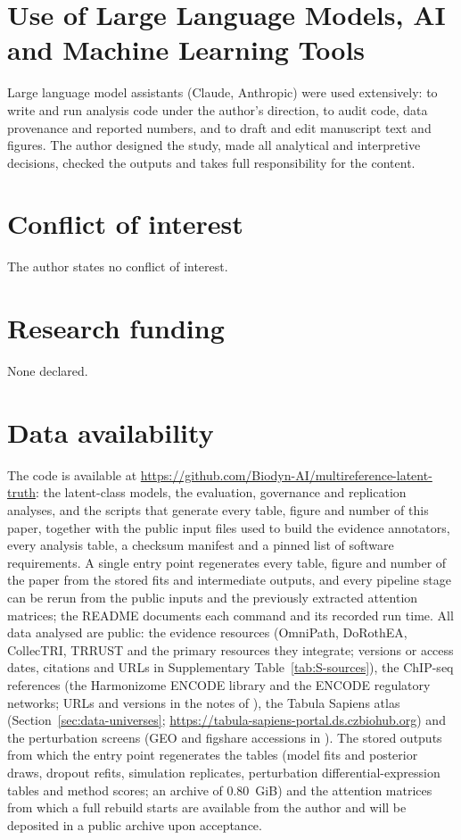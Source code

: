 \documentclass[11pt,a4paper]{article}
\begin{document}
\section*{Use of Large Language Models, AI and Machine Learning Tools}
Large language model assistants (Claude, Anthropic) were used extensively: to write and run analysis code under the author's direction, to audit code, data provenance and reported numbers, and to draft and edit manuscript text and figures. The author designed the study, made all analytical and interpretive decisions, checked the outputs and takes full responsibility for the content.

\section*{Conflict of interest}
The author states no conflict of interest.

\section*{Research funding}
None declared.

\section*{Data availability}
The code is available at \url{https://github.com/Biodyn-AI/multireference-latent-truth}: the latent-class models, the evaluation, governance and replication analyses, and the scripts that generate every table, figure and number of this paper, together with the public input files used to build the evidence annotators, every analysis table, a checksum manifest and a pinned list of software requirements.
A single entry point regenerates every table, figure and number of the paper from the stored fits and intermediate outputs, and every pipeline stage can be rerun from the public inputs and the previously extracted attention matrices; the README documents each command and its recorded run time.
All data analysed are public: the evidence resources (OmniPath, DoRothEA, CollecTRI, TRRUST and the primary resources they integrate; versions or access dates, citations and URLs in Supplementary Table~\ref{tab:S-sources}), the ChIP-seq references (the Harmonizome ENCODE library and the ENCODE regulatory networks; URLs and versions in the notes of ), the Tabula Sapiens atlas (Section~\ref{sec:data-universes}; \url{https://tabula-sapiens-portal.ds.czbiohub.org}) and the perturbation screens (GEO and figshare accessions in ).
The stored outputs from which the entry point regenerates the tables (model fits and posterior draws, dropout refits, simulation replicates, perturbation differential-expression tables and method scores; an archive of 0.80~GiB) and the attention matrices from which a full rebuild starts are available from the author and will be deposited in a public archive upon acceptance.
\end{document}
